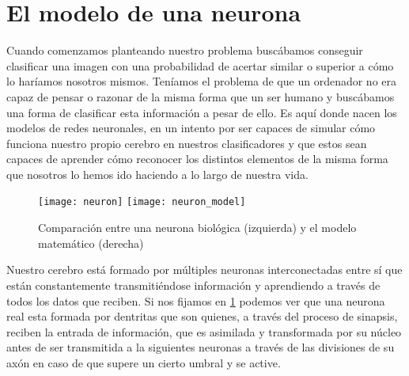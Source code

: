 \section{El modelo de una neurona}

Cuando comenzamos planteando nuestro problema buscábamos conseguir clasificar una imagen con una probabilidad de acertar similar o superior a cómo lo haríamos nosotros mismos. Teníamos el problema de que un ordenador no era capaz de pensar o razonar de la misma forma que un ser humano y buscábamos una forma de clasificar esta información a pesar de ello. Es aquí donde nacen los modelos de redes neuronales, en un intento por ser capaces de simular cómo funciona nuestro propio cerebro en nuestros clasificadores y que estos sean capaces de aprender cómo reconocer los distintos elementos de la misma forma que nosotros lo hemos ido haciendo a lo largo de nuestra vida.\newline

\begin{figure}[htpb]
  \centering
  \texttt{[image: neuron]}
  \vrule
  \texttt{[image: neuron\_model]}
  \caption{Comparación entre una neurona biológica (izquierda) y el modelo matemático (derecha) }
  \label{fig:neurona}
\end{figure}

Nuestro cerebro está formado por múltiples neuronas interconectadas entre sí que están constantemente transmitiéndose información y aprendiendo a través de todos los datos que reciben. Si nos fijamos en \ref{fig:neurona} podemos ver que una neurona real esta formada por dentritas que son quienes, a través del proceso de sinapsis, reciben la entrada de información, que es asimilada y transformada por su núcleo antes de ser transmitida a la siguientes neuronas a través de las divisiones de su axón en caso de que supere un cierto umbral y se active.\newline

